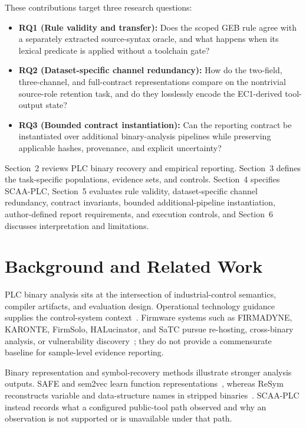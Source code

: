 \documentclass[a4paper,fleqn]{cas-dc}
\begin{document}
These contributions target three research questions:
\begin{itemize}
\item \textbf{RQ1 (Rule validity and transfer):} Does the scoped GEB rule agree with a separately extracted source-syntax oracle, and what happens when its lexical predicate is applied without a toolchain gate?
\item \textbf{RQ2 (Dataset-specific channel redundancy):} How do the two-field, three-channel, and full-contract representations compare on the nontrivial source-role retention task, and do they losslessly encode the EC1-derived tool-output state?
\item \textbf{RQ3 (Bounded contract instantiation):} Can the reporting contract be instantiated over additional binary-analysis pipelines while preserving applicable hashes, provenance, and explicit uncertainty?
\end{itemize}

Section~2 reviews PLC binary recovery and empirical reporting. Section~3 defines the task-specific populations, evidence sets, and controls. Section~4 specifies SCAA-PLC, Section~5 evaluates rule validity, dataset-specific channel redundancy, contract invariants, bounded additional-pipeline instantiation, author-defined report requirements, and execution controls, and Section~6 discusses interpretation and limitations.



\section{Background and Related Work}

PLC binary analysis sits at the intersection of industrial-control semantics, compiler artifacts, and evaluation design. Operational technology guidance supplies the control-system context~\citep{nist_sp800_82r3}. Firmware systems such as FIRMADYNE, KARONTE, FirmSolo, HALucinator, and SaTC pursue re-hosting, cross-binary analysis, or vulnerability discovery~\citep{firmadyne_ndss2016,karonte_sp2020,firmsolo_usenix2023,halucinator_usenix2020,satc_tdsc2024}; they do not provide a commensurate baseline for sample-level evidence reporting.

Binary representation and symbol-recovery methods illustrate stronger analysis outputs. SAFE and sem2vec learn function representations~\citep{safe_dimva2019,sem2vec_tosem2023}, whereas ReSym reconstructs variable and data-structure names in stripped binaries~\citep{resym_ccs2024}. SCAA-PLC instead records what a configured public-tool path observed and why an observation is not supported or is unavailable under that path.
\end{document}
